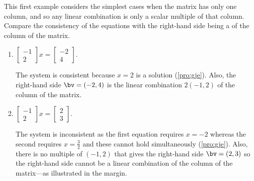 \begin{example} 
This first example considers the simplest cases when the matrix has only one column, and so any linear combination is only a scalar multiple of that column.
Compare the consistency of the equations with the right-hand side being a  of the column of the matrix.
\begin{enumerate}
\item \(\begin{bmatrix} -1\\2 \end{bmatrix}x
=\begin{bmatrix} -2\\4 \end{bmatrix}\).
\begin{solution} 
The system is consistent because \(x=2\) is a solution (\autoref{pro:gje}).
Also, the right-hand side \(\bv=(-2,4)\) is the linear combination \(2(-1,2)\) of the column of the matrix.
\end{solution}

\item \(\begin{bmatrix} -1\\2 \end{bmatrix}x
=\begin{bmatrix} 2\\3 \end{bmatrix}\).
\begin{solution} 
The system is inconsistent as the first equation requires \(x=-2\) whereas the second requires \(x=\tfrac32\) and these cannot hold simultaneously (\autoref{pro:gje}).
Also, there is no multiple of \((-1,2)\) that gives the right-hand side \(\bv=(2,3)\) so the right-hand side cannot be a linear combination of the column of the matrix---as illustrated in the margin.
\end{solution}


\end{enumerate}
\end{example}
